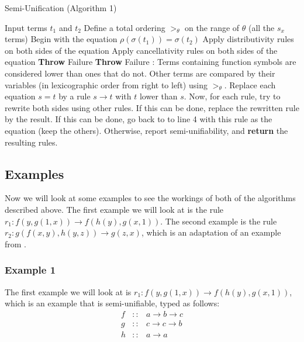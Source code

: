 \begin{algorithm}
\caption{Semi-Unification (Algorithm 1)}
\label{semiunification1}
\begin{algorithmic}[1]
\STATE Input terms $t_1$ and $t_2$
\STATE Define a total ordering $>_\theta$ on the range of $\theta$ (all the $s_x$ terms)
\STATE Begin with the equation $\rho(\sigma(t_1)) = \sigma(t_2)$
\STATE Apply distributivity rules on both sides of the equation
\STATE Apply cancellativity rules on both sides of the equation
    \STATE \textbf{Throw} Failure
    \STATE \textbf{Throw} Failure
  \ENDIF
\ENDFOR
\STATE {}:
\STATE Terms containing function symbols are considered lower than ones that do not.
\STATE Other terms are compared by their variables (in lexicographic order from right to left) using $>_\theta$.
\STATE Replace each equation $s = t$ by a rule $s \rightarrow t$ with $t$ lower than $s$.
\STATE Now, for each rule, try to rewrite both sides using other rules. If this can be done, replace the rewritten rule by the result.
\STATE If this can be done, go back to to line 4 with this rule as the equation (keep the others). 
\STATE Otherwise, report semi-unifiability, and \textbf{return} the resulting rules. 
\end{algorithmic}
\end{algorithm}

\subsection{Examples} %
Now we will look at some examples to see the workings of both of the algorithms described above. The first example we will look at is the rule $r_1 : f(y, g(1, x)) \rightarrow f(h(y), g(x, 1))$. The second example is the rule $r_2 : g(f(x, y), h(y, z)) \rightarrow g(z, x)$, which is an adaptation of an example from \cite{SemiUnification}. 
\subsubsection*{Example 1}
The first example we will look at is $r_1 : f(y, g(1, x)) \rightarrow f(h(y), g(x, 1))$, which is an example that is semi-unifiable, typed as follows: 
$$
\begin{array}{rcl}
    f & :: & a \rightarrow b \rightarrow c \\
    g & :: & c \rightarrow c \rightarrow b \\
    h & :: & a \rightarrow a 
\end{array}
$$

